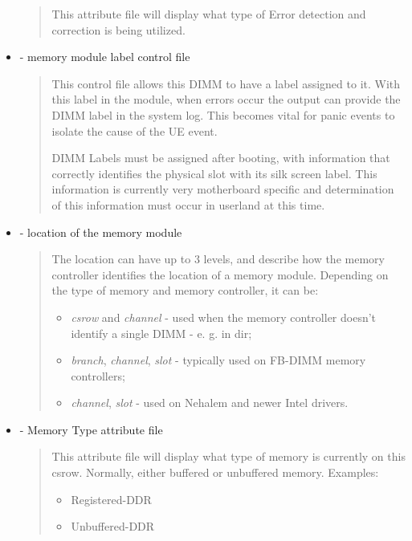 \documentclass[a4paper,8pt,english]{sphinxmanual}
\begin{document}
\begin{itemize}
\begin{quote}
This attribute file will display what type of Error detection
and correction is being utilized.
\end{quote}

\item {} 
 - memory module label control file
\begin{quote}

This control file allows this DIMM to have a label assigned
to it. With this label in the module, when errors occur
the output can provide the DIMM label in the system log.
This becomes vital for panic events to isolate the
cause of the UE event.

DIMM Labels must be assigned after booting, with information
that correctly identifies the physical slot with its
silk screen label. This information is currently very
motherboard specific and determination of this information
must occur in userland at this time.
\end{quote}

\item {} 
 - location of the memory module
\begin{quote}

The location can have up to 3 levels, and describe how the
memory controller identifies the location of a memory module.
Depending on the type of memory and memory controller, it
can be:
\begin{itemize}
\item {} 
\emph{csrow} and \emph{channel} - used when the memory controller
doesn't identify a single DIMM - e. g. in  dir;

\item {} 
\emph{branch}, \emph{channel}, \emph{slot} - typically used on FB-DIMM memory
controllers;

\item {} 
\emph{channel}, \emph{slot} - used on Nehalem and newer Intel drivers.

\end{itemize}
\end{quote}

\item {} 
 - Memory Type attribute file
\begin{quote}

This attribute file will display what type of memory is currently
on this csrow. Normally, either buffered or unbuffered memory.
Examples:
\begin{itemize}
\item {} 
Registered-DDR

\item {} 
Unbuffered-DDR

\end{itemize}
\end{quote}

\end{itemize}
\end{document}
